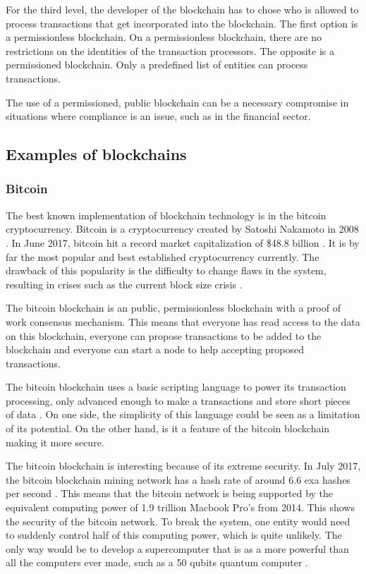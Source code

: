 For the third level, the developer of the blockchain has to chose who is allowed to process transactions that get incorporated into the blockchain. The first option is a permissionless blockchain. On a permissionless blockchain, there are no restrictions on the identities of the transaction processors. The opposite is a permissioned blockchain. Only a predefined list of entities can process transactions. 

The use of a permissioned, public blockchain can be a necessary compromise in situations where compliance is an issue, such as in the financial sector.


\subsection{Examples of blockchains}

\subsubsection{Bitcoin}


The best known implementation of blockchain technology is in the bitcoin cryptocurrency. Bitcoin is a cryptocurrency created by Satoshi Nakamoto in 2008 \cite{bitcoin-paper}. In June 2017, bitcoin hit a record market capitalization of \$48.8 billion \cite{bitcoin-market-cap}. It is by far the most popular and best established cryptocurrency currently. The drawback of this popularity is the difficulty to change flaws in the system, resulting in crises such as the current block size crisis \cite{bitcoin-civil-war}.

The bitcoin blockchain is an public, permissionless blockchain with a proof of work consensus mechanism. This means that everyone has read access to the data on this blockchain, everyone can propose transactions to be added to the blockchain and everyone can start a node to help accepting proposed transactions.

The bitcoin blockchain uses a basic scripting language to power its transaction processing, only advanced enough to make a transactions and store short pieces of data \cite{antonopoulos:2014}. On one side, the simplicity of this language could be seen as a limitation of its potential. On the other hand, is it a feature of the bitcoin blockchain making it more secure.

The bitcoin blockchain is interesting because of its extreme security. In July 2017, the bitcoin blockchain mining network has a hash rate of around 6.6 exa hashes per second \cite{bitcoin-hash-rate}. This means that the bitcoin network is being supported by the equivalent computing power of 1.9 trillion Macbook Pro's from 2014. This shows the security of the bitcoin network. To break the system, one entity would need to suddenly control half of this computing power, which is quite unlikely. The only way would be to develop a supercomputer that is as a more powerful than all the computers ever made, such as a 50 qubits quantum computer \cite{quantum-newsweek}.

